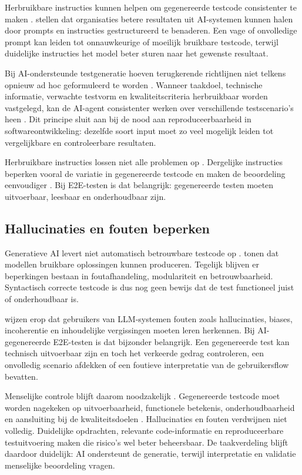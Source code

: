 Herbruikbare instructies kunnen helpen om gegenereerde testcode consistenter te maken \autocite{Lewis2023}. \textcite{Lewis2023} stellen dat organisaties betere resultaten uit AI-systemen kunnen halen door prompts en instructies gestructureerd te benaderen. Een vage of onvolledige prompt kan leiden tot onnauwkeurige of moeilijk bruikbare testcode, terwijl duidelijke instructies het model beter sturen naar het gewenste resultaat.

Bij AI-ondersteunde testgeneratie hoeven terugkerende richtlijnen niet telkens opnieuw ad hoc geformuleerd te worden \autocite{Lewis2023}. Wanneer taakdoel, technische informatie, verwachte testvorm en kwaliteitscriteria herbruikbaar worden vastgelegd, kan de AI-agent consistenter werken over verschillende testscenario's heen \autocite{Lewis2023}. Dit principe sluit aan bij de nood aan reproduceerbaarheid in softwareontwikkeling: dezelfde soort input moet zo veel mogelijk leiden tot vergelijkbare en controleerbare resultaten.

Herbruikbare instructies lossen niet alle problemen op \autocite{Lewis2023}. Dergelijke instructies beperken vooral de variatie in gegenereerde testcode en maken de beoordeling eenvoudiger \autocite{Lewis2023}. Bij E2E-testen is dat belangrijk: gegenereerde testen moeten uitvoerbaar, leesbaar en onderhoudbaar zijn.

\subsection{Hallucinaties en fouten beperken}

Generatieve AI levert niet automatisch betrouwbare testcode op \autocite{Kaynarpinar2025}. \textcite{Kaynarpinar2025} tonen dat modellen bruikbare oplossingen kunnen produceren. Tegelijk blijven er beperkingen bestaan in foutafhandeling, modulariteit en betrouwbaarheid. Syntactisch correcte testcode is dus nog geen bewijs dat de test functioneel juist of onderhoudbaar is.

\textcite{Ognibene2025} wijzen erop dat gebruikers van LLM-systemen fouten zoals hallucinaties, biases, incoherentie en inhoudelijke vergissingen moeten leren herkennen. Bij AI-gegenereerde E2E-testen is dat bijzonder belangrijk. Een gegenereerde test kan technisch uitvoerbaar zijn en toch het verkeerde gedrag controleren, een onvolledig scenario afdekken of een foutieve interpretatie van de gebruikersflow bevatten.

Menselijke controle blijft daarom noodzakelijk \autocite{Kaynarpinar2025,Ognibene2025}. Gegenereerde testcode moet worden nagekeken op uitvoerbaarheid, functionele betekenis, onderhoudbaarheid en aansluiting bij de kwaliteitsdoelen \autocite{Kaynarpinar2025,Ognibene2025}. Hallucinaties en fouten verdwijnen niet volledig. Duidelijke opdrachten, relevante code-informatie en reproduceerbare testuitvoering maken die risico's wel beter beheersbaar. De taakverdeling blijft daardoor duidelijk: AI ondersteunt de generatie, terwijl interpretatie en validatie menselijke beoordeling vragen.

